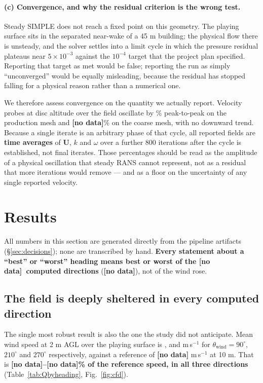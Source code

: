\documentclass[11pt,letterpaper]{article}
\newcommand{\MISSINGNUM}{\textbf{\color{red}[no data]}}%
\newcommand{\ConvCoarse}{\MISSINGNUM}\newcommand{\Uref}{\MISSINGNUM}%
\newcommand{\UfieldFracMin}{\MISSINGNUM}\newcommand{\UfieldFracMax}{\MISSINGNUM}%
\newcommand{\Ndirections}{\MISSINGNUM}\newcommand{\DirectionList}{\MISSINGNUM}%
\begin{document}
\paragraph{(c) Convergence, and why the residual criterion is the wrong test.}
Steady SIMPLE does not reach a fixed point on this geometry. The playing surface
sits in the separated near-wake of a 45 m building; the physical flow there is
unsteady, and the solver settles into a limit cycle in which the pressure
residual plateaus near $5\times10^{-3}$ against the $10^{-4}$ target that the
project plan specified. Reporting that target as met would be false; reporting
the run as simply ``unconverged'' would be equally misleading, because the
residual has stopped falling for a physical reason rather than a numerical one.

We therefore assess convergence on the quantity we actually report. Velocity
probes at disc altitude over the field oscillate by \ConvFine\% peak-to-peak
on the production mesh and \ConvCoarse\% on the coarse mesh, with no
downward trend. Because a single iterate is an arbitrary phase of that cycle,
all reported fields are \textbf{time averages} of $\mathbf{U}$, $k$ and
$\omega$ over a further 800 iterations after the cycle is established, not
final iterates. Those percentages should be read as the amplitude of a physical
oscillation that steady RANS cannot represent, not as a residual that more
iterations would remove --- and as a floor on the uncertainty of any single
reported velocity.

\section{Results}
\label{sec:results}

All numbers in this section are generated directly from the pipeline artifacts
(\S\ref{sec:decisions}); none are transcribed by hand. \textbf{Every statement
about a ``best'' or ``worst'' heading means best or worst of the
\Ndirections~computed directions} (\DirectionList), not of the wind rose.

\subsection{The field is deeply sheltered in every computed direction}

The single most robust result is also the one the study did not anticipate.
Mean wind speed at 2 m AGL over the playing surface is
\UfieldMeanHNineZero, \UfieldMeanHTwoOneZero{} and \UfieldMeanHTwoSevenZero{}
m\,s$^{-1}$ for $\theta_{\text{wind}} = 90^\circ$, $210^\circ$ and $270^\circ$
respectively, against a reference of \Uref{} m\,s$^{-1}$ at 10 m. That is
\textbf{\UfieldFracMin--\UfieldFracMax\% of the reference speed, in all three
directions}
(Table~\ref{tab:Qbyheading}, Fig.~\ref{fig:cfd}).
\end{document}
